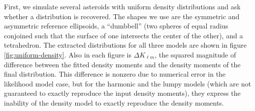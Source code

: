 \documentclass[fleqn,usenatbib]{mnras}
\begin{document}
First, we simulate several asteroids with uniform density distributions and ask whether a distribution is recovered. The shapes we use are the symmetric and asymmetric reference ellipsoids, a ``dumbbell'' (two spheres of equal radius conjoined such that the surface of one intersects the center of the other), and a tetrahedron. The extracted distributions for all three models are shown in figure \ref{fig:uniform-density}. Also in each figure is $\Delta K_{\ell m}$, the squared magnitude of difference between the fitted density moments and the density moments of the final distribution. This difference is nonzero due to numerical error in the likelihood model case, but for the harmonic and the lumpy models (which are not guaranteed to exactly reproduce the input density moments), they express the inability of the density model to exactly reproduce the density moments.
\end{document}
